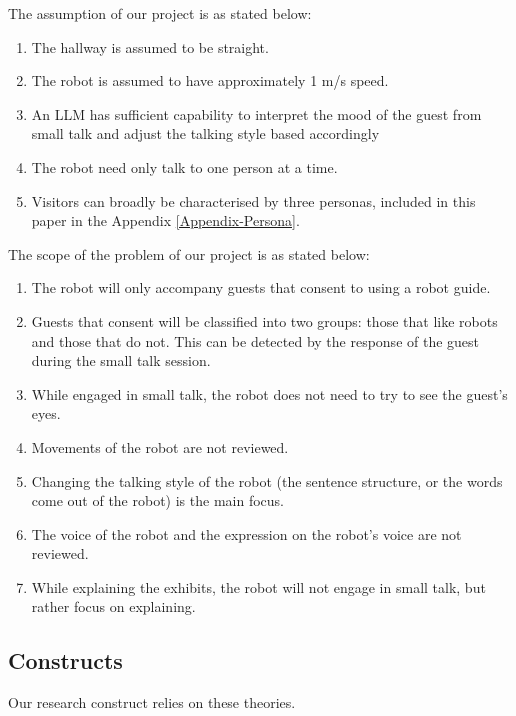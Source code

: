 \documentclass[conference]{IEEEtran}
\begin{document}
The assumption of our project is as stated below:
\begin{enumerate}
    \item The hallway is assumed to be straight.
    \item The robot is assumed to have approximately 1 m/s speed.
    \item An LLM has sufficient capability to interpret the mood of the guest from small talk and adjust the talking style based accordingly
    \item The robot need only talk to one person at a time.
    \item Visitors can broadly be characterised by three personas, included in this paper in the Appendix \ref{Appendix-Persona}.
\end{enumerate}

The scope of the problem of our project is as stated below:
\begin{enumerate}
    \item The robot will only accompany guests that consent to using a robot guide.
    \item Guests that consent will be classified into two groups: those that like robots and those that do not. This can be detected by the response of the guest during the small talk session.
    \item While engaged in small talk, the robot does not need to try to see the guest's eyes.
    \item Movements of the robot are not reviewed.
    \item Changing the talking style of the robot (the sentence structure, or the words come out of the robot) is the main focus.
    \item The voice of the robot and the expression on the robot's voice are not reviewed.
    \item While explaining the exhibits, the robot will not engage in small talk, but rather focus on explaining.
\end{enumerate}

\subsection{Constructs}

Our research construct relies on these theories. 
\end{document}
